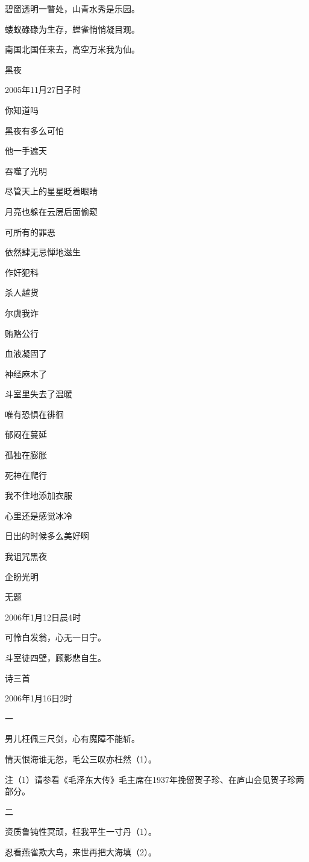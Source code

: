 \documentclass[../../dazhuan.tex]{subfiles}
\begin{document}
碧窗透明一瞥处，山青水秀是乐园。

蝼蚁碌碌为生存，螳雀悄悄凝目观。

南国北国任来去，高空万米我为仙。



黑夜

2005年11月27日子时

你知道吗

黑夜有多么可怕

他一手遮天

吞噬了光明

尽管天上的星星眨着眼睛

月亮也躲在云层后面偷窥

可所有的罪恶

依然肆无忌惮地滋生

作奸犯科

杀人越货

尔虞我诈

贿赂公行

血液凝固了

神经麻木了

斗室里失去了温暖

唯有恐惧在徘徊

郁闷在蔓延

孤独在膨胀

死神在爬行

我不住地添加衣服

心里还是感觉冰冷

日出的时候多么美好啊

我诅咒黑夜

企盼光明



无题

2006年1月12日晨4时

可怜白发翁，心无一日宁。

斗室徒四壁，顾影悲自生。



诗三首

2006年1月16日2时

一

男儿枉佩三尺剑，心有魔障不能斩。

情天恨海谁无怨，毛公三叹亦枉然（1）。

注（1）请参看《毛泽东大传》毛主席在1937年挽留贺子珍、在庐山会见贺子珍两部分。

二

资质鲁钝性冥顽，枉我平生一寸丹（1）。

忍看燕雀欺大鸟，来世再把大海填（2）。
\end{document}
